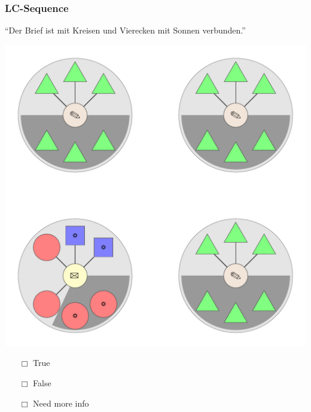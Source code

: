 \documentclass[fleqn,10pt,xcolor=dvipsnames]{beamer}
\newcommand{\LC}{LC\xspace}
\newcommand{\mymark}[1]{{\color{mycol}{#1}}}
\begin{document}
\begin{frame}
  \frametitle{\LC-Sequence}
  \begin{center}
    ``Der Brief ist mit Kreisen und Vierecken mit Sonnen verbunden.''

    \vspace{0.1cm}

    \includegraphics[width=0.5 \textwidth]{../../pictures/lc_01_3.pdf}

    \vspace{0.1cm}

    \begin{multicols}{3}
      \begin{itemize} 
      \item[$\Box$] True\\
        \onslide<2>{$\leadsto$  \mymark{LC}}
      \item[$\Box$] False\\
        \onslide<2>{$\leadsto$ \mymark{false}}
      \item[$\Box$] Need more info 
      \end{itemize}
    \end{multicols}

  \end{center}
\end{frame}
\end{document}
